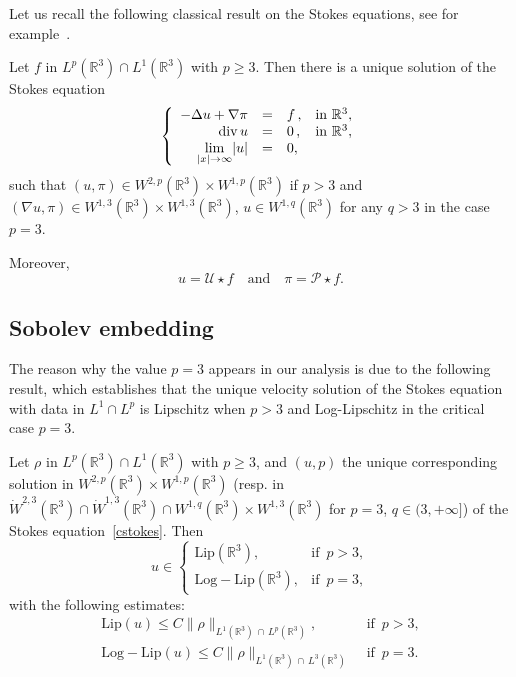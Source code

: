 \documentclass[10pt]{amsart}
\theoremstyle{definition}\newtheorem{defi}[theo]{Definition}\newtheorem{rema}[theo]{Remark}\newtheorem{exam}[theo]{Example}\newtheorem{exem}[theo]{Example}\newtheorem{nota}[theo]{Notation}
\newcommand{\Lip}{\mathrm{Lip}}
\newcommand{\LLip}{\mathrm{Log-Lip}}
\newcommand{\R}{\mathbb{R}}
\newcommand{\clP}{\mathcal{P}}
\newcommand{\clU}{\mathcal{U}}
\renewcommand{\leq}{\leqslant}
\renewcommand{\geq}{\geqslant}
\renewcommand{\div}{\operatorname{div}}
\begin{document}
Let us recall the following classical result on the Stokes equations, see for example~\cite[Theorem~IV.2.1]{Galdi}.

\begin{prop}\label{class-Stokes}
Let $f $ in $L^p (\R^3) \cap L^1 (\R^3) $ with $p\geq 3$. Then there is a unique solution of the Stokes equation
\begin{equation}\label{cstokes}
\left\{
\begin{array}{rcll}
- \Delta u+ \nabla \pi &=& f \,,& \text{in $ \R^3$},\\
\div u & =&0\,,& \text{in $ \R^3$},\\
\underset{|x|\to \infty}{\lim}|u| &=& 0,
\end{array}
\right.
\end{equation}
such that $(u,\pi)\in W^{2,p} (\R^3) \times W^{1,p} (\R^3) $ if $p>3$ and $(\nabla u,\pi)\in W^{1,3} (\R^3) \times W^{1,3} (\R^3) $, $u\in W^{1,q}(\R^3)$ for any $q>3$ in the case $p=3$.

Moreover,
\begin{equation}\label{formu-conv}
u=\clU \star f \quad\text{and}\quad \pi=\clP \star f.
\end{equation}
\end{prop}



\subsection{Sobolev embedding}

The reason why the value $p=3$ appears in our analysis is due to the following result, which establishes that the unique velocity solution of the Stokes equation with data in $ L^1\cap L^p$ is Lipschitz when $p>3$ and Log-Lipschitz in the critical case $p=3$.


\begin{prop}\label{prop_log_lip_u}
Let $\rho$ in $L^p (\R^3) \cap L^1 (\R^3) $ with $p\geq 3$, and $(u,p) $ the unique corresponding solution in $W^{2,p} (\R^3) \times W^{1,p} (\R^3) $ (resp. in $\dot{W}^{2,3} (\R^3)\cap \dot{W}^{1,3}(\R^3)\cap W^{1,q}(\R^3) \times W^{1,3} (\R^3) $ for $p=3$, $q\in(3,+\infty]$) of the Stokes equation~\eqref{cstokes}. Then
\begin{equation}\label{uli}
u \in
\begin{cases}
\Lip \left(\R^3\right), & \text{if } \, p > 3,
\\ \LLip \left(\R^3\right), & \text{if } \, p = 3,
\end{cases}
\end{equation}
with the following estimates:
\begin{align}
\Lip(u) \leq C \| \rho\|_{L^1 \left(\R^3\right)\,\cap \,L^p \left(\R^3\right)}, & \text{ if } \, p > 3,\label{esti-uli}
\\ 
\LLip (u) \leq C \| \rho\|_{L^1 \left(\R^3\right)\,\cap \,L^3 \left(\R^3\right)} & \text{ if } \, p = 3.\label{esti-ulli}
\end{align}
\end{prop}
\end{document}
